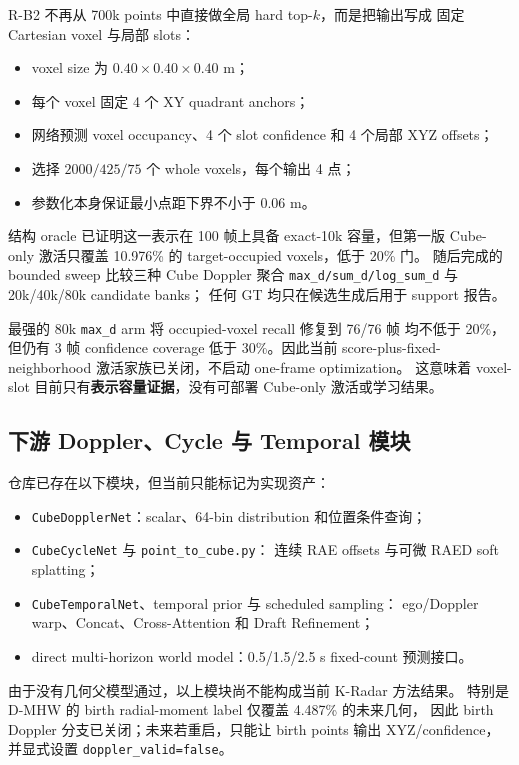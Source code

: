 \documentclass[11pt,a4paper,fontset=none]{ctexart}
\newcommand{\code}[1]{\texttt{#1}}
\begin{document}
R-B2 不再从 700k points 中直接做全局 hard top-$k$，而是把输出写成
固定 Cartesian voxel 与局部 slots：
\begin{itemize}
  \item voxel size 为 $0.40\times0.40\times0.40$ m；
  \item 每个 voxel 固定 4 个 XY quadrant anchors；
  \item 网络预测 voxel occupancy、4 个 slot confidence 和 4 个局部 XYZ offsets；
  \item 选择 $2000/425/75$ 个 whole voxels，每个输出 4 点；
  \item 参数化本身保证最小点距下界不小于 0.06 m。
\end{itemize}

结构 oracle 已证明这一表示在 100 帧上具备 exact-10k 容量，但第一版
Cube-only 激活只覆盖 10.976\% 的 target-occupied voxels，低于 20\% 门。
随后完成的 bounded sweep 比较三种 Cube Doppler 聚合
\code{max\_d/sum\_d/log\_sum\_d} 与 20k/40k/80k candidate banks；
任何 GT 均只在候选生成后用于 support 报告。

最强的 80k \code{max\_d} arm 将 occupied-voxel recall 修复到 76/76 帧
均不低于 20\%，但仍有 3 帧 confidence coverage 低于 30\%。因此当前
score-plus-fixed-neighborhood 激活家族已关闭，不启动 one-frame optimization。
这意味着 voxel-slot 目前只有\textbf{表示容量证据}，没有可部署 Cube-only
激活或学习结果。

\subsection{下游 Doppler、Cycle 与 Temporal 模块}

仓库已存在以下模块，但当前只能标记为实现资产：
\begin{itemize}
  \item \code{CubeDopplerNet}：scalar、64-bin distribution 和位置条件查询；
  \item \code{CubeCycleNet} 与 \code{point\_to\_cube.py}：
  连续 RAE offsets 与可微 RAED soft splatting；
  \item \code{CubeTemporalNet}、temporal prior 与 scheduled sampling：
  ego/Doppler warp、Concat、Cross-Attention 和 Draft Refinement；
  \item direct multi-horizon world model：0.5/1.5/2.5 s fixed-count 预测接口。
\end{itemize}

由于没有几何父模型通过，以上模块尚不能构成当前 K-Radar 方法结果。
特别是 D-MHW 的 birth radial-moment label 仅覆盖 4.487\% 的未来几何，
因此 birth Doppler 分支已关闭；未来若重启，只能让 birth points
输出 XYZ/confidence，并显式设置 \code{doppler\_valid=false}。
\end{document}
